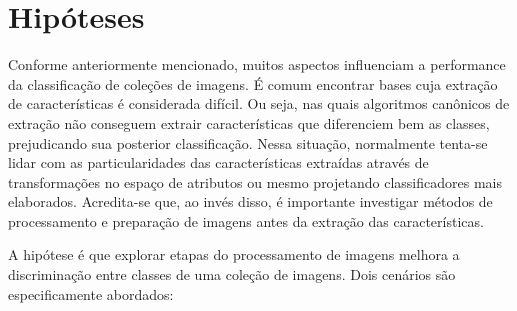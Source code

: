 %
%



\section{Hipóteses}

Conforme anteriormente mencionado, muitos aspectos influenciam a performance da classificação de coleções de imagens. É comum encontrar bases cuja extração de características é considerada difícil. Ou seja, nas quais algoritmos canônicos de extração não conseguem extrair características que diferenciem bem as classes, prejudicando sua posterior classificação. Nessa situação, normalmente tenta-se lidar com as particularidades das características extraídas através de transformações no espaço de atributos ou mesmo projetando classificadores mais elaborados. Acredita-se que, ao invés disso, é importante investigar métodos de processamento e preparação de imagens antes da extração das características.

A hipótese é que explorar etapas do processamento de imagens melhora a discriminação entre classes de uma coleção de imagens. Dois cenários são especificamente abordados:

